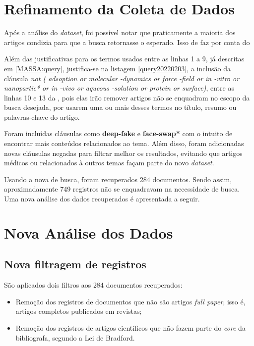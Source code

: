 \section{Refinamento da Coleta de Dados}

Após a análise do \textit{dataset}, foi possível notar que praticamente a maioria dos artigos condizia para que a busca retornasse o esperado. Isso de faz por conta do 


Além das justificativas para os termos usados entre as linhas 1 a 9, já descritas em \ref{MASSA:query},  justifica-se na listagem \ref{query20220203}, a inclusão da cláusula \textit{not (
 adsoption or molecular -dynamics or force -field
 or in -vitro or nanopartic* or in -vivo
 or aqueous -solution or protein or surface)}, entre as linhas 10 e 13 da \query, pois elas irão remover artigos não se enquadram no escopo da busca desejada, por usarem uma ou mais desses termos no título, resumo ou palavras-chave do artigo.
 
 Foram incluídas cláusulas como \textbf{deep-fake} e \textbf{face-swap*} com o intuito de encontrar mais conteúdos relacionados ao tema. Além disso, foram adicionadas novas cláusulas negadas para filtrar melhor os resultados, evitando que artigos médicos ou relacionados à outros temas façam parte do novo \textit{dataset}.
 
Usando a nova \textit{} de busca, foram recuperados 284 documentos. Sendo assim, aproximadamente 749 registros não se enquadravam na necessidade de busca.
Uma nova análise dos dados recuperados é apresentada a seguir.

\section{Nova Análise dos Dados}

\subsection{Nova filtragem de registros}

São aplicados dois filtros aos 284 documentos recuperados:
\begin{itemize}
    \item Remoção dos registros de documentos que não são artigos \textit{full paper}, isso é, artigos completos publicados em revistas;
    \item Remoção dos registros de artigos científicos que não fazem parte do \textit{core} da bibliografa, segundo a Lei de Bradford.
\end{itemize}

